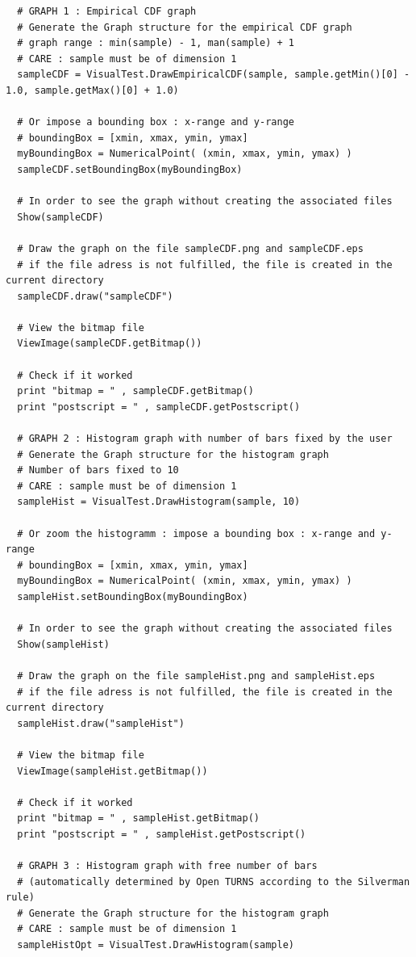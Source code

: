 \begin{lstlisting}
  # GRAPH 1 : Empirical CDF graph
  # Generate the Graph structure for the empirical CDF graph
  # graph range : min(sample) - 1, man(sample) + 1
  # CARE : sample must be of dimension 1
  sampleCDF = VisualTest.DrawEmpiricalCDF(sample, sample.getMin()[0] - 1.0, sample.getMax()[0] + 1.0)

  # Or impose a bounding box : x-range and y-range
  # boundingBox = [xmin, xmax, ymin, ymax]
  myBoundingBox = NumericalPoint( (xmin, xmax, ymin, ymax) )
  sampleCDF.setBoundingBox(myBoundingBox)

  # In order to see the graph without creating the associated files
  Show(sampleCDF)

  # Draw the graph on the file sampleCDF.png and sampleCDF.eps
  # if the file adress is not fulfilled, the file is created in the current directory
  sampleCDF.draw("sampleCDF")

  # View the bitmap file
  ViewImage(sampleCDF.getBitmap())

  # Check if it worked
  print "bitmap = " , sampleCDF.getBitmap()
  print "postscript = " , sampleCDF.getPostscript()

  # GRAPH 2 : Histogram graph with number of bars fixed by the user
  # Generate the Graph structure for the histogram graph
  # Number of bars fixed to 10
  # CARE : sample must be of dimension 1
  sampleHist = VisualTest.DrawHistogram(sample, 10)

  # Or zoom the histogramm : impose a bounding box : x-range and y-range
  # boundingBox = [xmin, xmax, ymin, ymax]
  myBoundingBox = NumericalPoint( (xmin, xmax, ymin, ymax) )
  sampleHist.setBoundingBox(myBoundingBox)

  # In order to see the graph without creating the associated files
  Show(sampleHist)

  # Draw the graph on the file sampleHist.png and sampleHist.eps
  # if the file adress is not fulfilled, the file is created in the current directory
  sampleHist.draw("sampleHist")

  # View the bitmap file
  ViewImage(sampleHist.getBitmap())

  # Check if it worked
  print "bitmap = " , sampleHist.getBitmap()
  print "postscript = " , sampleHist.getPostscript()

  # GRAPH 3 : Histogram graph with free number of bars
  # (automatically determined by Open TURNS according to the Silverman rule)
  # Generate the Graph structure for the histogram graph
  # CARE : sample must be of dimension 1
  sampleHistOpt = VisualTest.DrawHistogram(sample)


\end{lstlisting}
